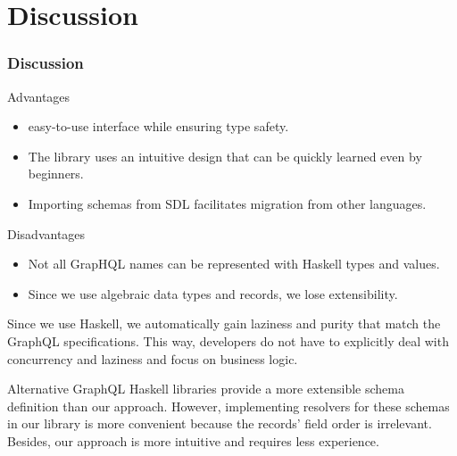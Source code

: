 \section{Discussion}

    
\begin{frame}[allowframebreaks]\frametitle{Discussion}

\begin{block}{Advantages}
\begin{itemize}
    \item easy-to-use interface while ensuring type safety.
    \item The library uses an intuitive design that can be quickly learned even by beginners.
    \item Importing schemas from SDL facilitates migration from other languages.
\end{itemize}
\end{block}

\begin{block}{Disadvantages}
\begin{itemize}
    \item Not all GrapHQL names can be represented with Haskell types and values.
    \item Since we use algebraic data types and records, we lose extensibility.
\end{itemize}
\end{block}

\vspace{40pt}

Since we use Haskell, we automatically gain laziness and purity that match the GraphQL specifications. This way, developers do not have to explicitly deal with concurrency and laziness and focus on business logic. 

Alternative GraphQL Haskell libraries provide a more extensible schema definition than our approach. However, implementing resolvers for these schemas in our library is more convenient because the records' field order is irrelevant. Besides, our approach is more intuitive and requires less experience.
    
\end{frame}

